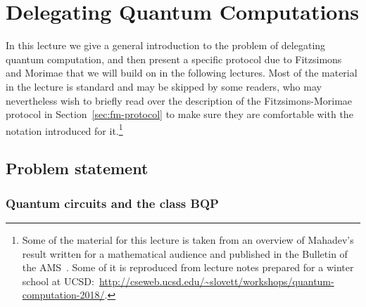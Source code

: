 \chapter{Delegating Quantum Computations}



In this lecture we give a general introduction to the problem of delegating quantum computation, and then present a specific protocol due to Fitzsimons and Morimae that we will build on in the following lectures. Most of the material in the lecture is standard and may be skipped by some readers, who may nevertheless wish to briefly read over the description of the Fitzsimons-Morimae protocol in Section~\ref{sec:fm-protocol} to make sure they are comfortable with the notation introduced for it.\footnote{Some of the material for this lecture is taken from an overview of Mahadev's result written for a mathematical audience and published in the Bulletin of the AMS~\cite{vidick2020verifying}. Some of it is reproduced from lecture notes prepared for a winter school at UCSD:~\url{http://cseweb.ucsd.edu/~slovett/workshops/quantum-computation-2018/}.} 

\section{Problem statement}
\label{sec:delegation-definitions}

\subsection{Quantum circuits and the class BQP}

